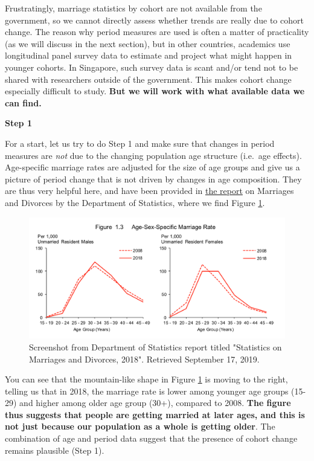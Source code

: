 \documentclass[openany]{book}
\begin{document}
Frustratingly, marriage statistics by cohort are not available from the
government, so we cannot directly assess whether trends are really due
to cohort change. The reason why period measures are used is often a
matter of practicality (as we will discuss in the next section), but in
other countries, academics use longitudinal panel survey data to
estimate and project what might happen in younger cohorts. In Singapore,
such survey data is scant and/or tend not to be shared with researchers
outside of the government. This makes cohort change especially difficult
to study. \textbf{But we will work with what available data we can
find.}

\textbf{Step 1}

For a start, let us try to do Step 1 and make sure that changes in
period measures are \emph{not} due to the changing population age
structure (i.e.~age effects). Age-specific marriage rates are adjusted
for the size of age groups and give us a picture of period change that
is not driven by changes in age composition. They are thus very helpful
here, and have been provided in
\href{https://www.singstat.gov.sg/-/media/files/publications/population/smd2018.pdf}{the
report} on Marriages and Divorces by the Department of Statistics, where
we find Figure \ref{fig:apc-reportsingstat}.

\begin{figure}

{\centering \includegraphics[width=0.8\linewidth]{images/apc/report_fig} 

}

\caption{Screenshot from Department of Statistics report titled "Statistics on Marriages and Divorces,  2018". Retrieved September 17, 2019.}\label{fig:apc-reportsingstat}
\end{figure}

You can see that the mountain-like shape in Figure
\ref{fig:apc-reportsingstat} is moving to the right, telling us that in
2018, the marriage rate is lower among younger age groups (15-29) and
higher among older age group (30+), compared to 2008. \textbf{The figure
thus suggests that people are getting married at later ages, and this is
not just because our population as a whole is getting older}. The
combination of age and period data suggest that the presence of cohort
change remains plausible (Step 1).
\end{document}
